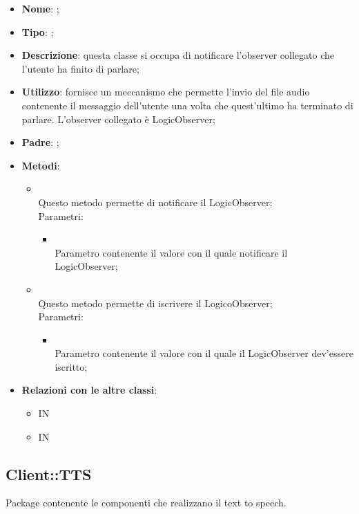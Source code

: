 \begin{itemize}
	\item \textbf{Nome}: ;
	\item \textbf{Tipo}: ;
	\item \textbf{Descrizione}: questa classe si occupa di notificare l'observer collegato che l'utente ha finito di parlare;
	\item \textbf{Utilizzo}: fornisce un meccanismo che permette l'invio del file audio contenente il messaggio dell'utente una volta che quest'ultimo ha terminato di parlare.
L'observer collegato è LogicObserver;
	\item \textbf{Padre}: ;
	\item \textbf{Metodi}:
	\begin{itemize}
		\item[]  \\
		Questo metodo permette di notificare il LogicObserver;\\
		Parametri:
		\begin{itemize}
			\item {} \\
			Parametro contenente il valore con il quale notificare il LogicObserver;
		\end{itemize}
		\item[]  \\
		Questo metodo permette di iscrivere il LogicoObserver;\\
		Parametri:
		\begin{itemize}
			\item {} \\
			Parametro contenente il valore con il quale il LogicObserver dev'essere iscritto;
		\end{itemize}
	\end{itemize}
	\item \textbf{Relazioni con le altre classi}:
	\begin{itemize}
		\item IN \hyperlink{Recorder_label}{}
		\item IN \hyperlink{SpeechEndObservable_label}{}
	\end{itemize}
\end{itemize}

\subsection{Client::TTS}
Package contenente le componenti che realizzano il text to speech.
